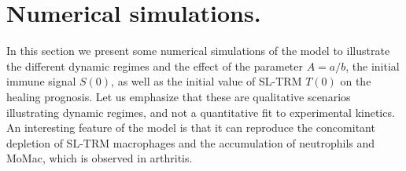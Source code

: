 \documentclass[a4paper, 12pt]{article}
\begin{document}
\section{Numerical simulations.}\label{sec:numerical_simulations}
In this section we present some numerical simulations of the model to illustrate the different dynamic regimes and the effect of the parameter $A=a/b$, the initial immune signal $S(0)$, as well as the initial value of SL-TRM $T(0)$ on the healing prognosis.
Let us emphasize that these are qualitative scenarios illustrating dynamic regimes, and not a quantitative fit to experimental kinetics.
An interesting feature of the model is that it can reproduce the concomitant depletion of SL-TRM macrophages and the accumulation of neutrophils and MoMac, which is observed in arthritis.%
\end{document}
